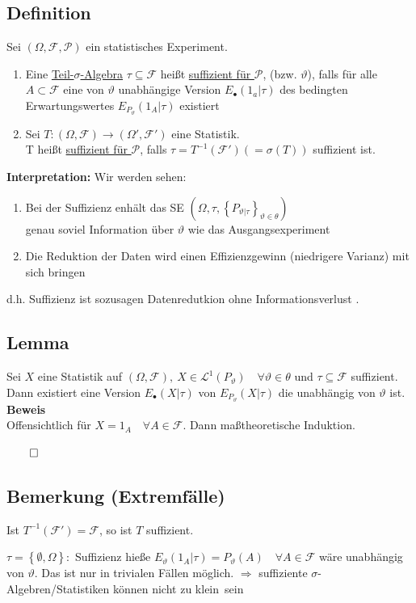 \documentclass[german,10pt,oneside, fleqn, a4paper]{article}
\newcommand{\Ra}	{\Rightarrow}
\newcommand{\ra}{\rightarrow}
\newcommand{\brac}[1]{\left\lbrace #1\right\rbrace}
\newcommand{\QED}{\begin{flushright}$\qed$\end{flushright}}
\newcommand{\mc}[1]{\mathcal{#1}}
\newcommand{\lp}[1]{\mc{L}^{#1}}
\newcommand{\beweis}{\textbf{Beweis}\\}
\newcommand{\1}[1]{1_{#1}}
\newcommand{\2}[1]{\1{\brac{#1}}}
\newcommand{\f}{\mc{F}}
\newcommand{\p}{\mc{P}}
\begin{document}
\subsection{Definition}
\label{10.2}
Sei $(\Omega,\f,\p)$ ein statistisches Experiment.\begin{enumerate}[label=(\alph*)]
\item Eine \underline{Teil-$\sigma$-Algebra} $\tau\subseteq\f$ heißt \underline{suffizient für $\p$}, (bzw. $\vartheta$), falls für alle $A\subset\f$ eine von $\vartheta$ unabhängige Version $E_\bullet(1_a|\tau)$ des bedingten Erwartungswertes $E_{P_\vartheta}(1_A|\tau)$ existiert
\item Sei $T:(\Omega,\f)\ra(\Omega',\f')$ eine Statistik.\\
T heißt \underline{suffizient für $\p$}, falls $\tau=T^{-1}(\f')(=\sigma(T))$ suffizient ist.\\
\end{enumerate}

\textbf{Interpretation:}
Wir werden sehen:\begin{enumerate}
\item Bei der Suffizienz enhält das SE $(\Omega, \tau, \brac{P_{\vartheta|\tau}}_{\vartheta\in\theta})$ \\genau soviel Information über $\vartheta$ wie das Ausgangsexperiment
\item Die Reduktion der Daten wird einen Effizienzgewinn (niedrigere Varianz) mit sich bringen
\end{enumerate}
d.h. Suffizienz ist sozusagen \glqq Datenredutkion ohne Informationsverlust \grqq.


\subsection{Lemma}
\label{10.3}
Sei $X$ eine Statistik auf $(\Omega,\f),\ X\in\lp{1}(P_\vartheta)\quad \forall\vartheta\in\theta$ und $\tau\subseteq\f$ suffizient.\\
Dann existiert eine Version $E_\bullet(X|\tau)$ von $E_{P_\vartheta}(X|\tau)$ die unabhängig von $\vartheta$ ist.\\
\beweis
Offensichtlich für $X=1_A\quad\forall A\in\f$. Dann maßtheoretische Induktion.\QED

\subsection{Bemerkung (Extremfälle)}
\label{10.4}
\begin{list}{•}{}
\item Ist $T^{-1}(\f')=\f$, so ist $T$ suffizient.
\item $\tau=\brac{\emptyset,\Omega}:$ Suffizienz hieße $E_\vartheta(1_A|\tau)=P_\vartheta(A)\quad\forall A\in\f$ wäre unabhängig von $\vartheta$. Das ist nur in trivialen Fällen möglich.
$\Ra$ suffiziente $\sigma$-Algebren/Statistiken können nicht \glqq zu klein\grqq\ sein
\end{list}
\end{document}
